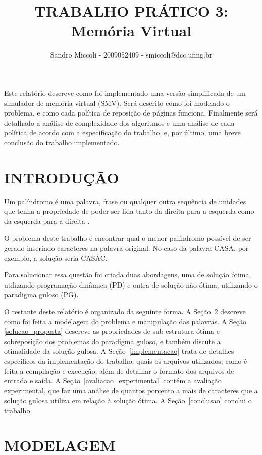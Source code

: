 \documentclass[12pt]{article}
\title{TRABALHO PRÁTICO 3: \\ Memória Virtual}
\author{Sandro Miccoli - 2009052409 - smiccoli@dcc.ufmg.br}
\begin{document}
\maketitle

\begin{resumo}
Este relatório descreve como foi implementado uma versão simplificada de um simulador de memória virtual (SMV). Será descrito como foi modelado o problema, e como cada política de reposição de páginas funciona. Finalmente será detalhado a análise de complexidade dos algoritmos e uma análise de cada política de acordo com a especificação do trabalho, e, por último, uma breve conclusão do trabalho implementado.
\end{resumo}

\section{INTRODUÇÃO}

    Um palíndromo é uma palavra, frase ou qualquer outra sequência de unidades que tenha a propriedade de poder ser lida tanto da direita para a esquerda como da esquerda para a direita \cite{wikipalin}.

    O problema deste trabalho é encontrar qual o menor palíndromo possível de ser gerado inserindo caracteres na palavra original. No caso da palavra CASA, por exemplo, a solução seria CASAC.

    Para solucionar essa questão foi criada duas abordagens, uma de solução ótima, utilizando programação dinâmica (PD) e outra de solução não-ótima, utilizando o paradigma guloso (PG).

	O restante deste relatório é organizado da seguinte forma. A Seção~\ref{modelagem} descreve como foi feita a modelagem do problema e manipulação das palavras. A Seção \ref{solucao_proposta} descreve as propriedades de sub-estrutura ótima e sobreposição dos problemas do paradigma guloso, e também discute a otimalidade da solução gulosa. A Seção~\ref{implementacao} trata de detalhes específicos da implementação do trabalho: quais os arquivos utilizados; como é feita a compilação e execução; além de detalhar o formato dos arquivos de entrada e saída. A Seção~\ref{avaliacao_experimental} contém a avaliação experimental, que faz uma análise de quantos porcento a mais de caracteres que a solução gulosa utiliza em relação à solução ótima. A Seção~\ref{conclusao} conclui o trabalho.


\section{MODELAGEM}
\label{modelagem}
\end{document}
